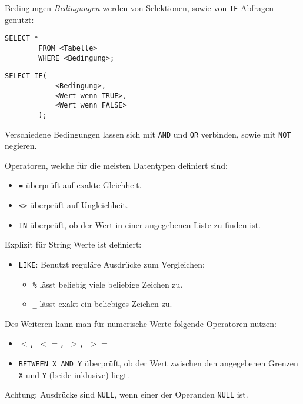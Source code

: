 \begin{sql}{Bedingungen}
    \emph{Bedingungen} werden von Selektionen, sowie von \texttt{IF}-Abfragen genutzt:

    \begin{lstlisting}[language=mysql]
        SELECT *
        FROM <Tabelle>
        WHERE <Bedingung>;
    \end{lstlisting}

    \begin{lstlisting}[language=mysql]
        SELECT IF(
            <Bedingung>,
            <Wert wenn TRUE>,
            <Wert wenn FALSE>
        );
    \end{lstlisting}

    Verschiedene Bedingungen lassen sich mit \texttt{AND} und \texttt{OR} verbinden, sowie mit \texttt{NOT} negieren.

    Operatoren, welche für die meisten Datentypen definiert sind:

    \begin{itemize}
        \item \texttt{=} überprüft auf exakte Gleichheit.
        \item \texttt{<>} überprüft auf Ungleichheit.
        \item \texttt{IN} überprüft, ob der Wert in einer angegebenen Liste zu finden ist.
    \end{itemize}

    Explizit für String Werte ist definiert:

    \begin{itemize}
        \item \texttt{LIKE}: Benutzt reguläre Ausdrücke zum Vergleichen:
              \begin{itemize}
                  \item \texttt{\%} lässt beliebig viele beliebige Zeichen zu.
                  \item \texttt{\_} lässt exakt ein beliebiges Zeichen zu.
              \end{itemize}
    \end{itemize}

    Des Weiteren kann man für numerische Werte folgende Operatoren nutzen:

    \begin{itemize}
        \item \texttt{$<$, $<=$, $>$, $>=$}
        \item \texttt{BETWEEN X AND Y} überprüft, ob der Wert zwischen den angegebenen Grenzen \texttt{X} und \texttt{Y} (beide inklusive) liegt.
    \end{itemize}

    Achtung: Ausdrücke sind \texttt{NULL}, wenn einer der Operanden \texttt{NULL} ist.
\end{sql}

